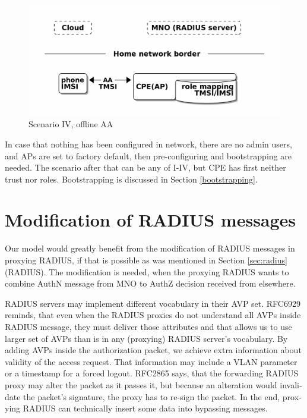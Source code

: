 \documentclass[12pt,a4paper,english]{tutthesis}
\begin{document}
\begin{otherlanguage}{english}
\begin{figure}[htb]
\centering
\includegraphics[width=.9\linewidth]{scenIV.png}
\caption{\label{fig:scenario-IV}Scenario IV, offline AA}
\end{figure}







In case that nothing has been configured in network, there are no 
admin users, and APs are set to factory default, then 
pre-configuring and bootstrapping are needed. The scenario after that can be any
of I-IV, but CPE  has first neither trust nor roles. Bootstrapping is discussed in 
Section \ref{bootstrapping}.


\section{Modification of RADIUS messages}
\label{sec-4-3}
\label{sec:radius-macs}

Our model would greatly benefit from the modification of RADIUS messages in proxying
RADIUS, if that is possible as was mentioned in Section \ref{sec:radius}(RADIUS).
The modification is needed, when the proxying RADIUS wants to combine AuthN message
from MNO to AuthZ decision received from elsewhere.




RADIUS servers may implement different vocabulary in their AVP set.
RFC6929\cite{rfc6929} reminds, that even when
the RADIUS proxies do not understand all AVPs inside RADIUS message, they
must deliver those attributes and that allows us to use larger set of AVPs 
than is in any (proxying) RADIUS server's vocabulary.
By adding AVPs inside the authorization packet, we achieve extra
information about validity of the access request.
That information may include a VLAN parameter or a timestamp for a forced
logout.
RFC2865\cite{rfc2865} says, that the forwarding RADIUS proxy may alter
the packet as it passes it, but because an alteration would invalidate the
packet's signature, the proxy has to re-sign the packet.
In the end, proxying RADIUS can technically insert some data into 
bypassing messages.






\end{otherlanguage}
\end{document}
